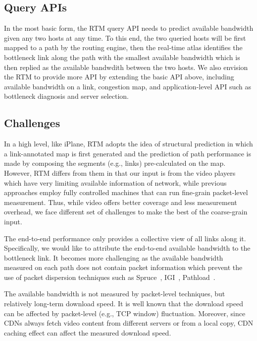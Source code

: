 \subsection{Query APIs}


In the most basic form, the RTM query API needs to predict available bandwidth given any two hosts at any time. To this end, the two queried hosts will be first mapped to a path by the routing engine, then the real-time atlas identifies the bottleneck link along the path with the smallest available bandwidth which is then replied as the available bandwdith between the two hosts. 
We also envision the RTM to provide more API by extending the basic API above, including available bandwidth on a link, congestion map, and application-level API such as bottleneck diagnosis and server selection.


\subsection{Challenges}

In a high level, like iPlane, RTM adopts the idea of structural prediction in which a link-annotated map is first generated and the prediction of path performance is made by composing the segments (e.g., links) pre-calculated on the map. However, RTM differs from them in that our input is from the video players which have very limiting available information of network, while previous approaches employ fully controlled machines that can run fine-grain packet-level measurement. Thus, while video offers better coverage and less measurement overhead, we face different set of challenges to make the best of the coarse-grain input.

 The end-to-end performance only provides a collective view of all links along it. Specifically, we would like to attribute the end-to-end available bandwidth to the bottleneck link. It becomes more challenging as the available bandwidth measured on each path does not contain packet information which prevent the use of packet dispersion techniques such as Spruce~\cite{}, IGI~\cite{}, Pathload~\cite{}.

 The available bandwidth is not measured by packet-level techniques, but relatively long-term download speed. It is well known that the download speed can be affected by packet-level (e.g., TCP window) fluctuation. Moreover, since CDNs always fetch video content from different servers or from a local copy, CDN caching effect can affect the measured download speed.

